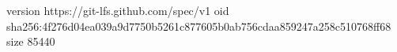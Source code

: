 version https://git-lfs.github.com/spec/v1
oid sha256:4f276d04ea039a9d7750b5261c877605b0ab756cdaa859247a258c510768ff68
size 85440
